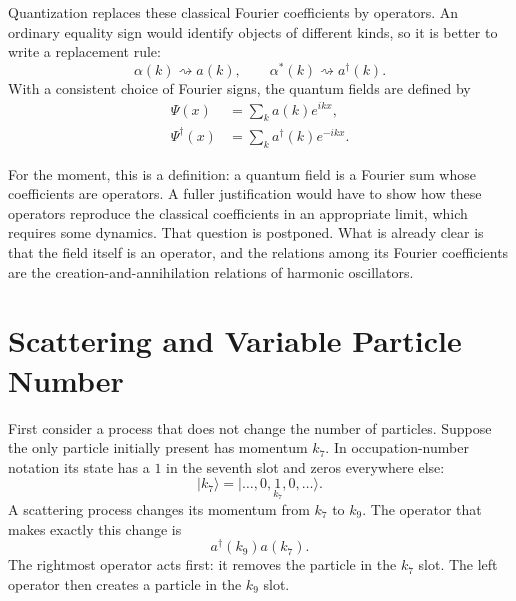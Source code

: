 Quantization replaces these classical Fourier coefficients by operators. An ordinary equality sign would identify objects of different kinds, so it is better to write a replacement rule:
\begin{equation}
\alpha(k)\rightsquigarrow a(k),
\qquad
\alpha^*(k)\rightsquigarrow a^\dagger(k).
\end{equation}
With a consistent choice of Fourier signs, the quantum fields are defined by
\begin{align}
\Psi(x)&=\sum_k a(k)e^{ikx},\\
\Psi^\dagger(x)&=\sum_k a^\dagger(k)e^{-ikx}.
\end{align}

For the moment, this is a definition: a quantum field is a Fourier sum whose coefficients are operators. A fuller justification would have to show how these operators reproduce the classical coefficients in an appropriate limit, which requires some dynamics. That question is postponed. What is already clear is that the field itself is an operator, and the relations among its Fourier coefficients are the creation-and-annihilation relations of harmonic oscillators.

\begin{classroomqa}
\end{classroomqa}

\section{Scattering and Variable Particle Number}

First consider a process that does not change the number of particles. Suppose the only particle initially present has momentum \(k_7\). In occupation-number notation its state has a \(1\) in the seventh slot and zeros everywhere else:
\begin{equation}
|k_7\rangle
=
|\ldots,0,\underset{k_7}{1},0,\ldots\rangle.
\end{equation}
A scattering process changes its momentum from \(k_7\) to \(k_9\). The operator that makes exactly this change is
\begin{equation}
a^\dagger(k_9)a(k_7).
\end{equation}
The rightmost operator acts first: it removes the particle in the \(k_7\) slot. The left operator then creates a particle in the \(k_9\) slot.


